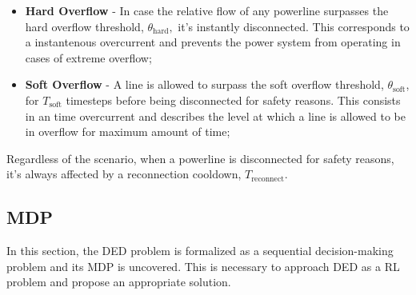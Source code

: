 \begin{itemize}
	\item \textbf{Hard Overflow} - In case the relative flow of any powerline surpasses the hard overflow threshold, $\theta_\text{hard},$ it's instantly disconnected. This corresponds to a instantenous overcurrent and prevents the power system from operating in cases of extreme overflow;
	\item \textbf{Soft Overflow} - A line is allowed to surpass the soft overflow threshold, $\theta_\text{soft}$, for $T_\text{soft}$ timesteps before being disconnected for safety reasons. This consists in an time overcurrent and describes the level at which a line is allowed to be in overflow for maximum amount of time;
\end{itemize}
Regardless of the scenario, when a powerline is disconnected for safety reasons, it's always affected by a reconnection cooldown, $T_\text{reconnect}$.

\subsection{\acf{MDP}} \label{sec:method-mdp}

In this section, the \ac{DED} problem is formalized as a sequential decision-making problem and its \ac{MDP} is uncovered. This is necessary to approach \ac{DED} as a \ac{RL} problem and propose an appropriate solution. 

